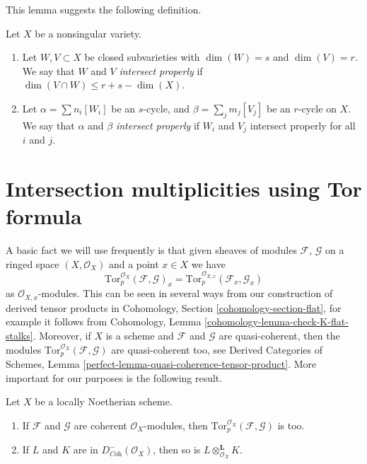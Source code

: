 \noindent
This lemma suggests the following definition.

\begin{definition}
\label{definition-proper-intersection}
Let $X$ be a nonsingular variety.
\begin{enumerate}
\item Let $W,V \subset X$ be closed subvarieties with
$\dim(W) = s$ and $\dim(V) = r$. We say that $W$ and $V$
{\it intersect properly} if $\dim(V \cap W) \leq r + s - \dim(X)$.
\item Let $\alpha = \sum n_i [W_i]$ be an $s$-cycle,
and $\beta = \sum_j m_j [V_j]$ be an $r$-cycle on $X$. We say
that $\alpha$ and $\beta$ {\it intersect properly} if
$W_i$ and $V_j$ intersect properly for all $i$ and $j$.
\end{enumerate}
\end{definition}


\section{Intersection multiplicities using Tor formula}
\label{section-tor-formula}

\noindent
A basic fact we will use frequently is that given sheaves of
modules $\mathcal{F}$, $\mathcal{G}$ on a ringed space $(X, \mathcal{O}_X)$
and a point $x \in X$ we have
$$
\text{Tor}_p^{\mathcal{O}_X}(\mathcal{F}, \mathcal{G})_x =
\text{Tor}_p^{\mathcal{O}_{X, x}}(\mathcal{F}_x, \mathcal{G}_x)
$$
as $\mathcal{O}_{X, x}$-modules. This can be seen in several ways
from our construction of derived tensor products in
Cohomology, Section \ref{cohomology-section-flat}, for example it follows from
Cohomology, Lemma \ref{cohomology-lemma-check-K-flat-stalks}.
Moreover, if $X$ is a scheme and $\mathcal{F}$ and $\mathcal{G}$
are quasi-coherent, then the modules
$\text{Tor}_p^{\mathcal{O}_X}(\mathcal{F}, \mathcal{G})$ are
quasi-coherent too, see
Derived Categories of Schemes, Lemma
\ref{perfect-lemma-quasi-coherence-tensor-product}.
More important for our purposes is the following result.

\begin{lemma}
\label{lemma-tensor-coherent}
Let $X$ be a locally Noetherian scheme.
\begin{enumerate}
\item If $\mathcal{F}$ and $\mathcal{G}$ are coherent $\mathcal{O}_X$-modules,
then $\text{Tor}_p^{\mathcal{O}_X}(\mathcal{F}, \mathcal{G})$ is too.
\item If $L$ and $K$ are in $D^-_{\textit{Coh}}(\mathcal{O}_X)$, then
so is $L \otimes_{\mathcal{O}_X}^\mathbf{L} K$.
\end{enumerate}
\end{lemma}

